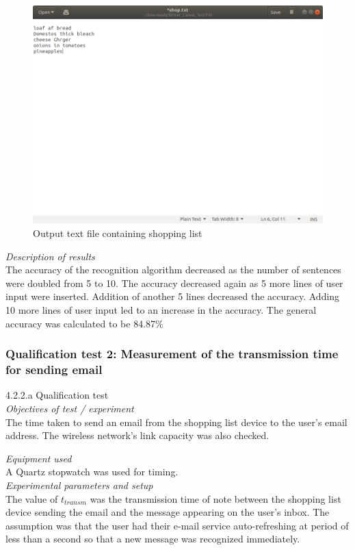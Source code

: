 \begin{figure}[h]
	\centering
	\includegraphics[scale=0.4]{106}
	\caption{Output text file containing shopping list}
\end{figure}
\clearpage
\textit{Description of results}\\
The accuracy of the recognition algorithm decreased as the number of sentences were doubled from 5 to 10. The accuracy decreased again as 5 more lines of user input were inserted. Addition of another 5 lines decreased the accuracy. Adding 10 more lines of user input led to an increase in the accuracy. The general accuracy was calculated to be 84.87$\%$

\subsubsection{Qualification test 2: Measurement of the transmission time for sending email}

4.2.2.a Qualification test\\
\textit{Objectives of test / experiment}\\
The time taken to send an email from the shopping list device to the user's email address. The wireless network's link capacity was also checked. 

\textit{Equipment used}\\
A Quartz stopwatch was used for timing.
\\

\textit{Experimental parameters and setup}\\
The value of $t_{transm}$ was the transmission time of note between the shopping list device sending the email and the message appearing on the user's inbox. The assumption was that the user had their e-mail service auto-refreshing at period of less than a second so that a new message was recognized immediately.

